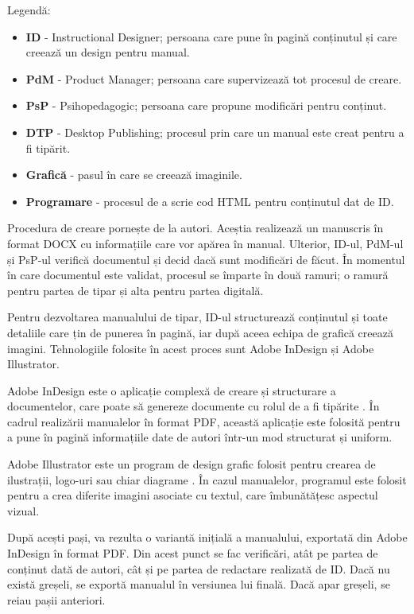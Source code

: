 \noindent
Legendă:
\begin{itemize}
	\item \textbf{ID} - Instructional Designer; persoana care pune în pagină conținutul și care creează un design pentru manual.
	\item \textbf{PdM} - Product Manager; persoana care supervizează tot procesul de creare.
	\item \textbf{PsP} - Psihopedagogic; persoana care propune modificări pentru conținut.
	\item \textbf{DTP} - Desktop Publishing; procesul prin care un manual este creat pentru a fi tipărit.
	\item \textbf{Grafică} - pasul în care se creează imaginile.
	\item \textbf{Programare} - procesul de a scrie cod HTML pentru conținutul dat de ID.
\end{itemize}

Procedura de creare pornește de la autori. Aceștia realizează un manuscris în format DOCX cu informațiile care vor apărea în manual. Ulterior, ID-ul, PdM-ul și PsP-ul verifică documentul și decid dacă sunt modificări de făcut. În momentul în care documentul este validat, procesul se împarte în două ramuri; o ramură pentru partea de tipar și alta pentru partea digitală.

Pentru dezvoltarea manualului de tipar, ID-ul structurează conținutul și toate detaliile care țin de punerea în pagină, iar după aceea echipa de grafică creează imagini. Tehnologiile folosite în acest proces sunt Adobe InDesign și Adobe Illustrator.

Adobe InDesign este o aplicație complexă de creare și structurare a documentelor, care poate să genereze documente cu rolul de a fi tipărite \cite{adobe2007adobe}. În cadrul realizării manualelor în format PDF, această aplicație este folosită pentru a pune în pagină informațiile date de autori într-un mod structurat și uniform.

Adobe Illustrator este un program de design grafic folosit pentru crearea de ilustrații, logo-uri sau chiar diagrame \cite{tupper2021}. În cazul manualelor, programul este folosit pentru a crea diferite imagini asociate cu textul, care îmbunătățesc aspectul vizual.

După acești pași, va rezulta o variantă inițială a manualului, exportată din Adobe InDesign în format PDF. Din acest punct se fac  verificări, atât pe partea de conținut dată de autori, cât și pe partea de redactare realizată de ID. Dacă nu există greșeli, se exportă manualul în versiunea lui finală. Dacă apar greșeli, se reiau pașii anteriori.


